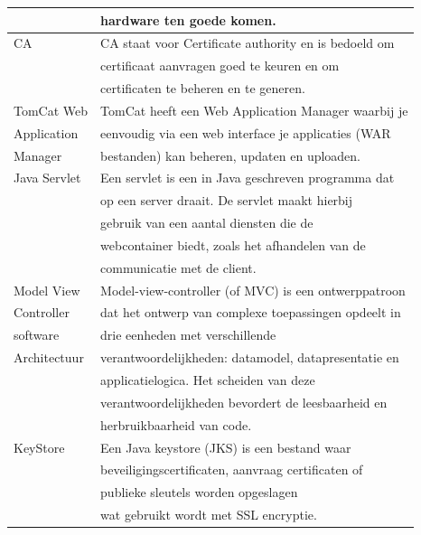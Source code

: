 \documentclass[]{article}
\begin{document}
\begin{tabular}{|| l | l ||}
                     & hardware ten goede komen.                            \\\hline
    CA               & CA staat voor Certificate authority en is bedoeld om \\
                     & certificaat aanvragen goed te keuren en om           \\
                     & certificaten te beheren en te generen.               \\\hline
    TomCat Web       & TomCat heeft een Web Application Manager waarbij je  \\
    Application      & eenvoudig via een web interface je applicaties (WAR  \\
    Manager          & bestanden) kan beheren, updaten en uploaden.         \\\hline
    Java Servlet     & Een servlet is een in Java geschreven programma dat  \\
                     & op een server draait. De servlet maakt hierbij       \\
                     & gebruik van een aantal diensten die de               \\
                     & webcontainer biedt, zoals het afhandelen van de      \\
                     & communicatie met de client.                          \\\hline
    Model View       & Model-view-controller (of MVC) is een ontwerppatroon \\
    Controller       & dat het ontwerp van complexe toepassingen opdeelt in \\
    software         & drie eenheden met verschillende                      \\
    Architectuur     & verantwoordelijkheden: datamodel, datapresentatie en \\
                     & applicatielogica. Het scheiden van deze              \\
                     & verantwoordelijkheden bevordert de leesbaarheid en   \\
                     & herbruikbaarheid van code.                           \\\hline
    KeyStore         & Een Java keystore (JKS) is een bestand waar          \\
                     & beveiligingscertificaten, aanvraag certificaten of   \\
                     & publieke sleutels worden opgeslagen                  \\
                     & wat gebruikt wordt met SSL encryptie.                \\\hline
\end{tabular}
\end{document}
